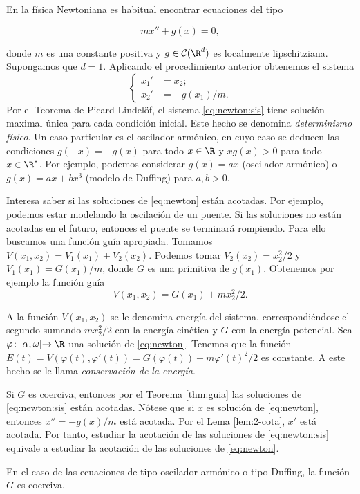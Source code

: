 \documentclass{article}
\begin{document}
\begin{ex}
  En la física Newtoniana es habitual encontrar ecuaciones del tipo
  
  \begin{equation}
    \label{eq:newton}
    m x'' + g(x) = 0,
  \end{equation}

  donde $m$ es una constante positiva y $g \in \mathcal{C}(\R^d)$ es localmente
  lipschitziana. Supongamos que $d = 1$. Aplicando el procedimiento anterior obtenemos el sistema
  \begin{equation}
    \label{eq:newton:sis}
    \begin{cases}
      x_1' & = x_2; \\
      x_2' & = - g(x_1) / m.
    \end{cases}
  \end{equation}
  Por el Teorema de Picard-Lindelöf, el sistema \eqref{eq:newton:sis} tiene solución maximal única
  para cada condición inicial. Este hecho se denomina \emph{determinismo físico}. Un caso particular
  es el oscilador armónico, en cuyo caso se deducen las condiciones $g(-x) = -g(x)$ para todo
  $x \in \R$ y $x g(x) > 0$ para todo $x \in \R^{*}$. Por ejemplo, podemos considerar $g(x) = ax$
  (oscilador armónico) o $g(x) = ax + bx^3$ (modelo de Duffing) para $a,b > 0$.

  Interesa saber si las soluciones de \eqref{eq:newton} están acotadas. Por ejemplo, podemos estar
  modelando la oscilación de un puente. Si las soluciones no están acotadas en el futuro, entonces
  el puente se terminará rompiendo. Para ello buscamos una función guía apropiada. Tomamos
  $V(x_1, x_2) = V_1(x_1)+V_2(x_2)$. Podemos tomar $V_2(x_2) = x_2^2 / 2$ y $V_1(x_1) = G(x_1) / m$,
  donde $G$ es una primitiva de $g(x_1)$. Obtenemos por ejemplo la función guía
  \[ V(x_1, x_2) = G(x_1) + m x_2^2 / 2. \]

  A la función $V(x_1, x_2)$ se le denomina energía del sistema, correspondiéndose el segundo
  sumando $m x_2^2 / 2$ con la energía cinética y $G$ con la energía potencial. Sea
  $\varphi \colon ]\alpha, \omega[ \to \R$ una solución de \eqref{eq:newton}. Tenemos que la función
  $E(t) = V(\varphi(t), \varphi'(t)) = G(\varphi(t)) + m \varphi'(t)^2/2$ es constante. A este hecho
  se le llama \emph{conservación de la energía}.

  Si $G$ es coerciva, entonces por el Teorema \ref{thm:guia} las soluciones de \eqref{eq:newton:sis}
  están acotadas. Nótese que si $x$ es solución de \eqref{eq:newton}, entonces $x'' = -g(x)/m$ está
  acotada. Por el Lema \ref{lem:2-cota}, $x'$ está acotada. Por tanto, estudiar la acotación de las
  soluciones de \eqref{eq:newton:sis} equivale a estudiar la acotación de las soluciones de
  \eqref{eq:newton}.
  
  En el caso de las ecuaciones de tipo oscilador armónico o tipo Duffing, la función $G$ es
  coerciva.
\end{ex}
  
\end{document}
